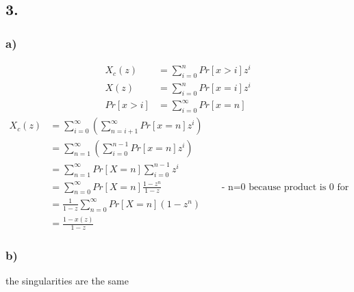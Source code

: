 \subsection*{ 3. }

\subsubsection*{ a) }

\begin{align*}
X_{c}\left(z\right)&=\sum _{{i=0}}^{n}Pr\left[x> i\right]z^{i}\\
X\left(z\right)&=\sum _{{i=0}}^{n}Pr\left[x=i\right]z^{i}\\
Pr\left[x> i\right]&=\sum _{{i=0}}^{\infty }Pr\left[x=n\right]
\end{align*}
\begin{align*}
X_{c}\left(z\right)&=\sum _{{i=0}}^{\infty }\left(\sum _{{n=i+1}}^{\infty } Pr\left[x=n\right] z^{i}\right)\\
&=\sum _{{n=1}}^{\infty }\left(\sum _{{i=0}}^{{n-1}}Pr\left[x=n\right] z^{i}\right)\\
&=\sum _{{n=1}}^{\infty }Pr\left[X=n\right]\sum _{{i=0}}^{{n-1}}z^{i}\\
&=\sum _{{n=0}}^{\infty }Pr\left[X=n\right]\frac{1-z^{n}}{1-z} && \text{ - n=0 because product is 0 for n=0 - }\\
&=\frac{1}{1-z} \sum _{{n=0}}^{\infty }Pr\left[X=n\right](1-z^{n})\\
&=\frac{1-x\left(z\right)}{1-z}
\end{align*}

\subsubsection*{ b) }

the singularities are the same